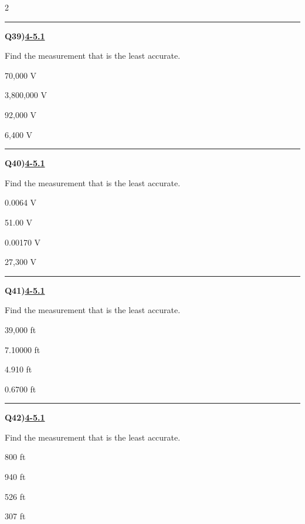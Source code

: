 \documentclass[11pt]{article}
\newenvironment{Qbox}[2]{%
  \par\medskip\noindent\begin{minipage}{\linewidth}%
  \hrule\medskip%
  \textbf{Q#1)}\hfill\textbf{\underline{#2}}\par\smallskip%
}{\par\end{minipage}\par\medskip}
\begin{document}
\begin{multicols}{2}
\begin{Qbox}{39}{4-5.1}
Find the measurement that is the least accurate.
\begin{choices}
  \item 70,000 V
  \item 3,800,000 V
  \item 92,000 V
  \item 6,400 V
\end{choices}
\end{Qbox}

\begin{Qbox}{40}{4-5.1}
Find the measurement that is the least accurate.
\begin{choices}
  \item 0.0064 V
  \item 51.00 V
  \item 0.00170 V
  \item 27,300 V
\end{choices}
\end{Qbox}

\begin{Qbox}{41}{4-5.1}
Find the measurement that is the least accurate.
\begin{choices}
  \item 39,000 ft
  \item 7.10000 ft
  \item 4.910 ft
  \item 0.6700 ft
\end{choices}
\end{Qbox}

\begin{Qbox}{42}{4-5.1}
Find the measurement that is the least accurate.
\begin{choices}
  \item 800 ft
  \item 940 ft
  \item 526 ft
  \item 307 ft
\end{choices}
\end{Qbox}


\end{multicols}
\end{document}
